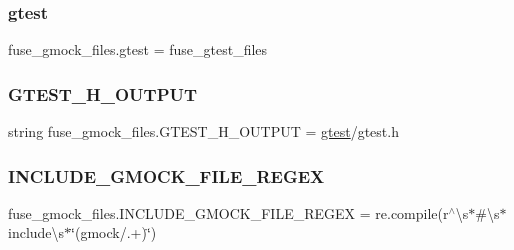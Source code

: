 \subsubsection{\texorpdfstring{gtest}{gtest}}
{\footnotesize\ttfamily fuse\+\_\+gmock\+\_\+files.\+gtest = fuse\+\_\+gtest\+\_\+files}

\mbox{\label{namespacefuse__gmock__files_a385c31d8542b0a2e4b7f46cb2a32d7da}} 
\subsubsection{\texorpdfstring{GTEST\_H\_OUTPUT}{GTEST\_H\_OUTPUT}}
{\footnotesize\ttfamily string fuse\+\_\+gmock\+\_\+files.\+G\+T\+E\+S\+T\+\_\+\+H\+\_\+\+O\+U\+T\+P\+UT = \textquotesingle{}\mbox{\hyperlink{namespacefuse__gmock__files_a3fb36dbe8d361f9ecc54e1aa4b94b068}{gtest}}/gtest.\+h\textquotesingle{}}

\mbox{\label{namespacefuse__gmock__files_aeb4457451f878d6bc8a42f7ff3e5f6cf}} 
\subsubsection{\texorpdfstring{INCLUDE\_GMOCK\_FILE\_REGEX}{INCLUDE\_GMOCK\_FILE\_REGEX}}
{\footnotesize\ttfamily fuse\+\_\+gmock\+\_\+files.\+I\+N\+C\+L\+U\+D\+E\+\_\+\+G\+M\+O\+C\+K\+\_\+\+F\+I\+L\+E\+\_\+\+R\+E\+G\+EX = re.\+compile(r\textquotesingle{}$^\wedge$\textbackslash{}s$\ast$\#\textbackslash{}s$\ast$include\textbackslash{}s$\ast$\char`\"{}(gmock/.+)\char`\"{}\textquotesingle{})}

